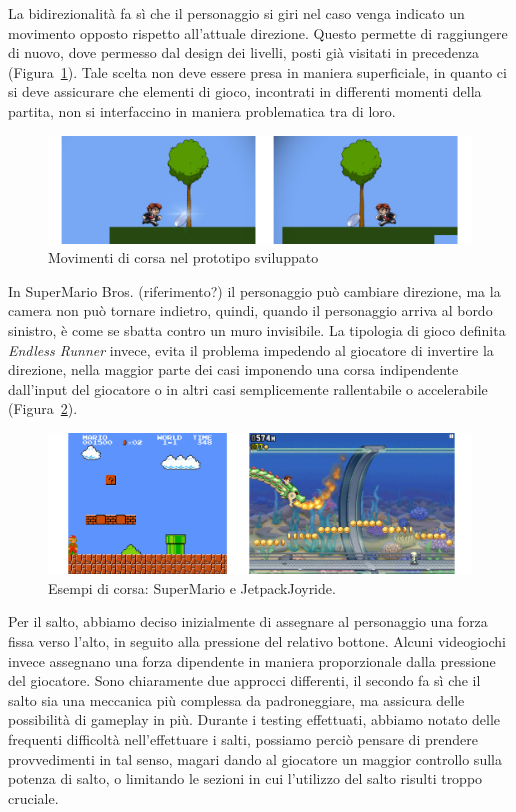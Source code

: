 La bidirezionalità fa sì che il personaggio si giri nel caso venga indicato un movimento opposto rispetto all’attuale direzione. Questo permette di raggiungere di nuovo, dove permesso dal design dei livelli, posti già visitati in precedenza (Figura~\ref{fig:platform_corsa}). Tale scelta non deve essere presa in maniera superficiale, in quanto ci si deve assicurare che elementi di gioco, incontrati in differenti momenti della partita, non si interfaccino in maniera problematica tra di loro. 
\begin{figure}%
	\centering
	\includegraphics[width= \columnwidth]{images/gameDesign/03.jpg}
	\caption{Movimenti di corsa nel prototipo sviluppato}
	\label{fig:platform_corsa}
\end{figure}
In SuperMario Bros. (riferimento?) il personaggio può cambiare direzione, ma la camera non può tornare indietro, quindi, quando il personaggio arriva al bordo sinistro, è come se sbatta contro un muro invisibile.
La tipologia di gioco definita \textit{Endless Runner} invece, evita il problema impedendo al giocatore di invertire la direzione, nella maggior parte dei casi imponendo una corsa indipendente dall’input del giocatore o in altri casi semplicemente rallentabile o accelerabile (Figura~\ref{fig:platform_corsa_reali}).

\begin{figure}%
	\centering
	\includegraphics[width= \columnwidth]{images/gameDesign/04.jpg}
	\caption{Esempi di corsa: SuperMario e JetpackJoyride.}
	\label{fig:platform_corsa_reali}
\end{figure}

Per il salto, abbiamo deciso inizialmente di assegnare al personaggio una forza fissa verso l’alto, in seguito alla pressione del relativo bottone. Alcuni videogiochi invece assegnano una forza dipendente in maniera proporzionale dalla pressione del giocatore. Sono chiaramente due approcci differenti, il secondo fa sì che il salto sia una meccanica più complessa da padroneggiare, ma assicura delle possibilità di gameplay in più.
Durante i testing effettuati, abbiamo notato delle frequenti difficoltà nell’effettuare i salti, possiamo perciò pensare di prendere provvedimenti in tal senso, magari dando al giocatore un maggior controllo sulla potenza di salto, o limitando le sezioni in cui l’utilizzo del salto risulti troppo cruciale.

